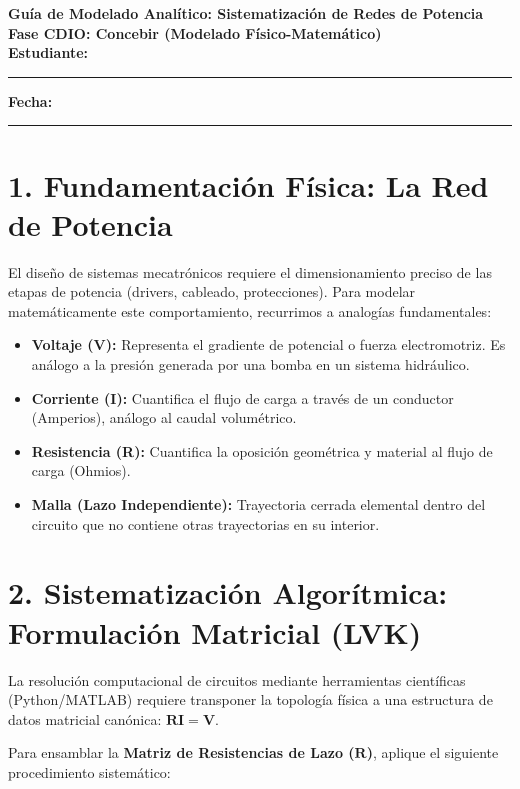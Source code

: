 \documentclass[11pt,a4paper]{article}
\begin{document}
\begin{center}
    {\Large \textbf{\textcolor{UCBblue}{Guía de Modelado Analítico: Sistematización de Redes de Potencia}}}\\
    \vspace{0.3cm}
    {\large \textbf{Fase CDIO: Concebir (Modelado Físico-Matemático)}}\\
    \vspace{0.5cm}
    \textbf{Estudiante:} \rule{8cm}{0.4pt} \quad \textbf{Fecha:} \rule{3cm}{0.4pt}
\end{center}

\vspace{0.5cm}

\section*{1. Fundamentación Física: La Red de Potencia}
El diseño de sistemas mecatrónicos requiere el dimensionamiento preciso de las etapas de potencia (drivers, cableado, protecciones). Para modelar matemáticamente este comportamiento, recurrimos a analogías fundamentales:
\begin{itemize}
    \item \textbf{Voltaje (V):} Representa el gradiente de potencial o fuerza electromotriz. Es análogo a la presión generada por una bomba en un sistema hidráulico.
    \item \textbf{Corriente (I):} Cuantifica el flujo de carga a través de un conductor (Amperios), análogo al caudal volumétrico.
    \item \textbf{Resistencia (R):} Cuantifica la oposición geométrica y material al flujo de carga (Ohmios).
    \item \textbf{Malla (Lazo Independiente):} Trayectoria cerrada elemental dentro del circuito que no contiene otras trayectorias en su interior.
\end{itemize}

\section*{2. Sistematización Algorítmica: Formulación Matricial (LVK)}
La resolución computacional de circuitos mediante herramientas científicas (Python/MATLAB) requiere transponer la topología física a una estructura de datos matricial canónica: $\mathbf{R}\mathbf{I} = \mathbf{V}$. 

Para ensamblar la \textbf{Matriz de Resistencias de Lazo ($\mathbf{R}$)}, aplique el siguiente procedimiento sistemático:
\end{document}

